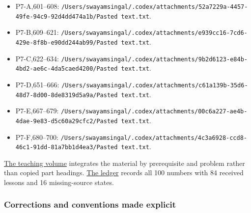 \begin{itemize}
\tightlist
\item
  P7-A,601--608: \texttt{/Users/swayamsingal/.codex/attachments/52a7229a-4457-49fe-94c9-92d4dd474a1b/Pasted\ text.txt}.
\item
  P7-B,609--621: \texttt{/Users/swayamsingal/.codex/attachments/e939cc16-7cd6-429e-8f8b-e90dd244ab99/Pasted\ text.txt}.
\item
  P7-C,622--634: \texttt{/Users/swayamsingal/.codex/attachments/9b2d6123-e84b-4bd2-ae6c-4da5caed4200/Pasted\ text.txt}.
\item
  P7-D,651--666: \texttt{/Users/swayamsingal/.codex/attachments/c61a139b-35d6-48d7-8d00-8de8319d5a9a/Pasted\ text.txt}.
\item
  P7-E,667--679: \texttt{/Users/swayamsingal/.codex/attachments/00c6a227-ae4b-4dae-9e83-d5c60a29cfc2/Pasted\ text.txt}.
\item
  P7-F,680--700: \texttt{/Users/swayamsingal/.codex/attachments/4c3a6928-ccd8-46c1-91dd-81a7bb1d4ea3/Pasted\ text.txt}.
\end{itemize}

\hyperref[01-foundations-i-ch018-keep-the-promises-visible-while-moving-between-representations]{The teaching volume} integrates the material by prerequisite and problem rather than copied part headings. \hyperref[appendix-fd090d982a15-phase-7---parts-601-700]{The ledger} records all 100 numbers with 84 received lessons and 16 missing-source states.

\subsubsection{Corrections and conventions made explicit}\label{appendix-a103e7846d21-corrections-and-conventions-made-explicit}

